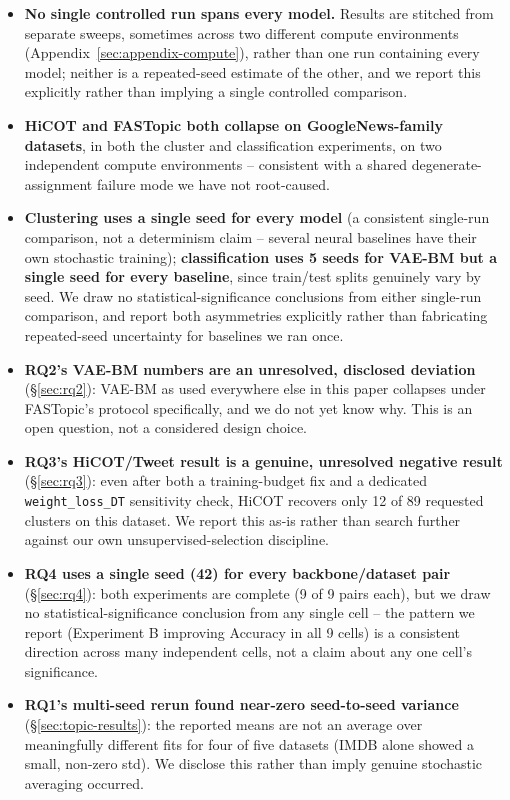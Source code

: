 \documentclass[11pt]{article}
\begin{document}
\begin{itemize}
\item \textbf{No single controlled run spans every model.} Results are stitched from separate sweeps, sometimes across two different compute environments (Appendix~\ref{sec:appendix-compute}), rather than one run containing every model; neither is a repeated-seed estimate of the other, and we report this explicitly rather than implying a single controlled comparison.
\item \textbf{HiCOT and FASTopic both collapse on GoogleNews-family datasets}, in both the cluster and classification experiments, on two independent compute environments -- consistent with a shared degenerate-assignment failure mode we have not root-caused.
\item \textbf{Clustering uses a single seed for every model} (a consistent single-run comparison, not a determinism claim -- several neural baselines have their own stochastic training); \textbf{classification uses 5 seeds for VAE-BM but a single seed for every baseline}, since train/test splits genuinely vary by seed. We draw no statistical-significance conclusions from either single-run comparison, and report both asymmetries explicitly rather than fabricating repeated-seed uncertainty for baselines we ran once.
\item \textbf{RQ2's VAE-BM numbers are an unresolved, disclosed deviation} (\S\ref{sec:rq2}): VAE-BM as used everywhere else in this paper collapses under FASTopic's protocol specifically, and we do not yet know why. This is an open question, not a considered design choice.
\item \textbf{RQ3's HiCOT/Tweet result is a genuine, unresolved negative result} (\S\ref{sec:rq3}): even after both a training-budget fix and a dedicated \texttt{weight\_loss\_DT} sensitivity check, HiCOT recovers only 12 of 89 requested clusters on this dataset. We report this as-is rather than search further against our own unsupervised-selection discipline.
\item \textbf{RQ4 uses a single seed (42) for every backbone/dataset pair} (\S\ref{sec:rq4}): both experiments are complete (9 of 9 pairs each), but we draw no statistical-significance conclusion from any single cell -- the pattern we report (Experiment B improving Accuracy in all 9 cells) is a consistent direction across many independent cells, not a claim about any one cell's significance.
\item \textbf{RQ1's multi-seed rerun found near-zero seed-to-seed variance} (\S\ref{sec:topic-results}): the reported means are not an average over meaningfully different fits for four of five datasets (IMDB alone showed a small, non-zero std). We disclose this rather than imply genuine stochastic averaging occurred.
\end{itemize}
\end{document}
